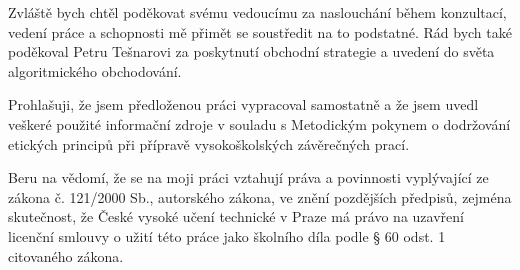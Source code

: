 \documentclass[czech,master,unicode]{ctufit-thesis}
\theoremstyle{plain}
\theoremstyle{definition}
\theoremstyle{remark}
\numberwithin{theorem}{chapter}
\begin{document}
 
\frontmatter\frontmatterinit %


\thispagestyle{empty}\cleardoublepage\maketitle %

\imprintpage %

\tableofcontents %
\listoffigures %
\begingroup
\let\clearpage\relax
\listoftables %
\lstlistoflistings %
\endgroup

\begin{acknowledgmentpage}
Zvláště bych chtěl poděkovat svému vedoucímu za naslouchání během konzultací, vedení práce a schopnosti mě přimět se soustředit na to podstatné.
Rád bych také poděkoval Petru Tešnarovi za poskytnutí obchodní strategie a uvedení do světa algoritmického obchodování.

\end{acknowledgmentpage} 


\begin{declarationpage}
Prohlašuji, že jsem předloženou práci vypracoval samostatně a že jsem uvedl veškeré použité
informační zdroje v souladu s Metodickým pokynem o dodržování etických principů při přípravě
vysokoškolských závěrečných prací.

Beru na vědomí, že se na moji práci vztahují práva a povinnosti vyplývající ze zákona č. 121/2000 Sb.,
autorského zákona, ve znění pozdějších předpisů, zejména skutečnost, že České vysoké učení
technické v Praze má právo na uzavření licenční smlouvy o užití této práce jako školního díla podle §
60 odst. 1 citovaného zákona.
\end{declarationpage}
\end{document}

